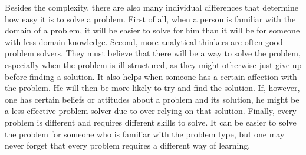 Besides the complexity, there are also many individual differences that determine how easy it is to solve a problem. First of all, when a person is familiar with the domain of a problem, it will be easier to solve for him than it will be for someone with less domain knowledge. Second, more analytical thinkers are often good problem solvers. They must believe that there will be a way to solve the problem, especially when the problem is ill-structured, as they might otherwise just give up before finding a solution. It also helps when someone has a certain affection with the problem. He will then be more likely to try and find the solution. If, however, one has certain beliefs or attitudes about a problem and its solution, he might be a less effective problem solver due to over-relying on that solution. Finally, every problem is different and requires different skills to solve. It can be easier to solve the problem for someone who is familiar with the problem type, but one may never forget that every problem requires a different way of learning.

